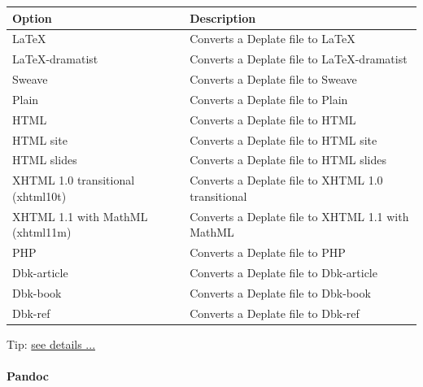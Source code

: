 \begin{scriptsize}
  \begin{tabularx}{\textwidth}{>{\hsize=0.6\hsize}X>{\hsize=0.7\hsize}X}\\
    \hline
    \textbf{Option} & \textbf{Description} \\
    \hline
    \LaTeX & Converts a Deplate file to \LaTeX \\
    LaTeX-dramatist & Converts a Deplate file to LaTeX-dramatist \\
    Sweave & Converts a Deplate file to Sweave \\
    Plain & Converts a Deplate file to Plain \\
    HTML & Converts a Deplate file to HTML \\
    HTML site & Converts a Deplate file to HTML site \\
    HTML slides & Converts a Deplate file to HTML slides \\
    XHTML 1.0 transitional (xhtml10t) & Converts a Deplate file to XHTML 1.0 transitional \\
    XHTML 1.1 with MathML (xhtml11m) & Converts a Deplate file to XHTML 1.1 with MathML \\
    PHP & Converts a Deplate file to PHP \\
    Dbk-article & Converts a Deplate file to Dbk-article \\
    Dbk-book & Converts a Deplate file to Dbk-book \\
    Dbk-ref & Converts a Deplate file to Dbk-ref \\
    \hline
  \end{tabularx}
\end{scriptsize}

Tip: \href{http://deplate.sourceforge.net/Output.html}{see details ...}


\newpage
\hypertarget{menu_tools_processing_conversion_pandoc}{}
\paragraph{}\textbf{Pandoc}\\


